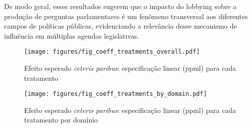 De modo geral, esses resultados sugerem que o impacto do lobbying sobre a produção de perguntas parlamentares é um fenômeno transversal aos diferentes campos de políticas públicas, evidenciando a relevância desse mecanismo de influência em múltiplas agendas legislativas.


\begin{figure}[htbp]
    \centering
    \texttt{[image: figures/fig\_coeff\_treatments\_overall.pdf]}
    \caption{Efeito esperado \textit{ceteris paribus}: especificação linear (\acrshort{ppml}) para cada tratamento}
    \label{fig:effect_linear_ppml_treatments}
\end{figure}


\begin{landscape}
\thispagestyle{plain}
\begin{figure}[p]
    \centering
    \texttt{[image: figures/fig\_coeff\_treatments\_by\_domain.pdf]}
    \caption{Efeito esperado \textit{ceteris paribus}: especificação linear (\acrshort{ppml}) para cada tratamento por domínio} 
    \label{fig:effect_linear_ppml_treatments_by_domain}
\end{figure}
\end{landscape}


